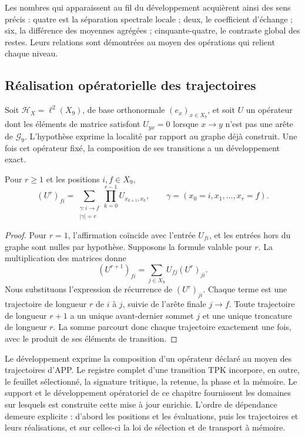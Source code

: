 Les nombres qui apparaissent au fil du développement acquièrent ainsi des sens précis : quatre est la séparation spectrale locale ; deux, le coefficient d'échange ; six, la différence des moyennes agrégées ; cinquante-quatre, le contraste global des restes. Leurs relations sont démontrées au moyen des opérations qui relient chaque niveau.

\subsection{Réalisation opératorielle des trajectoires}
\label{geo:operadores-trayectorias}

Soit $\mathcal H_X=\ell^2(X_9)$, de base orthonormale $(e_x)_{x\in X_9}$, et soit $U$ un opérateur dont les éléments de matrice satisfont $U_{yx}=0$ lorsque $x\to y$ n'est pas une arête de $\mathscr G_9$. L'hypothèse exprime la localité par rapport au graphe déjà construit. Une fois cet opérateur fixé, la composition de ses transitions a un développement exact.

\begin{teorema}
\label{geo:thm-expansion}
Pour $r\geq1$ et les positions $i,f\in X_9$,
\[
 (U^r)_{fi}
 =\sum_{\substack{\gamma:i\to f\\|\gamma|=r}}
   \prod_{k=0}^{r-1}U_{x_{k+1},x_k},
 \qquad\gamma=(x_0=i,x_1,\ldots,x_r=f).
\]
\end{teorema}

\begin{proof}
Pour $r=1$, l'affirmation coïncide avec l'entrée $U_{fi}$, et les entrées hors du graphe sont nulles par hypothèse. Supposons la formule valable pour $r$. La multiplication des matrices donne
\[
 (U^{r+1})_{fi}=\sum_{j\in X_9}U_{fj}(U^r)_{ji}.
\]
Nous substituons l'expression de récurrence de $(U^r)_{ji}$. Chaque terme est une trajectoire de longueur $r$ de $i$ à $j$, suivie de l'arête finale $j\to f$. Toute trajectoire de longueur $r+1$ a un unique avant-dernier sommet $j$ et une unique troncature de longueur $r$. La somme parcourt donc chaque trajectoire exactement une fois, avec le produit de ses éléments de transition.
\end{proof}

Le développement exprime la composition d'un opérateur déclaré au moyen des trajectoires d'APP. Le registre complet d'une transition TPK incorpore, en outre, le feuillet sélectionné, la signature tritique, la retenue, la phase et la mémoire. Le support et le développement opératoriel de ce chapitre fournissent les domaines sur lesquels est construite cette mise à jour enrichie. L'ordre de dépendance demeure explicite : d'abord les positions et les évaluations, puis les trajectoires et leurs réalisations, et sur celles-ci la loi de sélection et de transport à mémoire.

